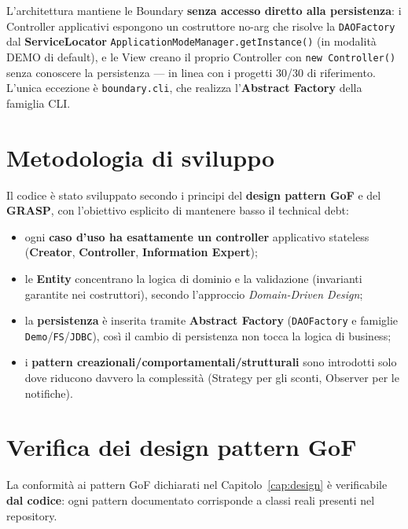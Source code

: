 L'architettura mantiene le Boundary \textbf{senza accesso diretto alla
persistenza}: i Controller applicativi espongono un costruttore no-arg che
risolve la \texttt{DAOFactory} dal \textbf{ServiceLocator}
\texttt{ApplicationModeManager.getInstance()} (in modalità DEMO di default), e
le View creano il proprio Controller con \texttt{new Controller()} senza
conoscere la persistenza — in linea con i progetti 30/30 di riferimento.
L'unica eccezione è \texttt{boundary.cli}, che realizza l'\textbf{Abstract
Factory} della famiglia CLI.

\section{Metodologia di sviluppo}
\label{sec:qualita_metodologia}

Il codice è stato sviluppato secondo i principi del \textbf{design pattern GoF}
e del \textbf{GRASP}, con l'obiettivo esplicito di mantenere basso il technical
debt:

\begin{itemize}
    \item ogni \textbf{caso d'uso ha esattamente un controller} applicativo
    stateless (\textbf{Creator}, \textbf{Controller}, \textbf{Information Expert});
    \item le \textbf{Entity} concentrano la logica di dominio e la validazione
    (invarianti garantite nei costruttori), secondo l'approccio
    \emph{Domain-Driven Design};
    \item la \textbf{persistenza} è inserita tramite \textbf{Abstract Factory}
    (\texttt{DAOFactory} e famiglie \texttt{Demo}/\texttt{FS}/\texttt{JDBC}),
    così il cambio di persistenza non tocca la logica di business;
    \item i \textbf{pattern creazionali/comportamentali/strutturali} sono
    introdotti solo dove riducono davvero la complessità (Strategy per gli
    sconti, Observer per le notifiche).
\end{itemize}

\section{Verifica dei design pattern GoF}
\label{sec:qualita_gof}

La conformità ai pattern GoF dichiarati nel Capitolo~\ref{cap:design} è
verificabile \textbf{dal codice}: ogni pattern documentato corrisponde a classi
reali presenti nel repository.

